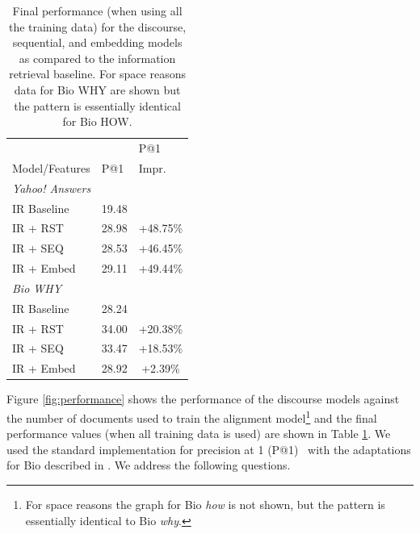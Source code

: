 \begin{table}[t!]
\begin{center}
\begin{footnotesize}
\begin{tabular}{llc}
\multicolumn{1}{l}{ } & \multicolumn{1}{l}{ } & \multicolumn{1}{l}{P@1} \\
\multicolumn{1}{l}{ Model/Features } & \multicolumn{1}{l}{P@1} & \multicolumn{1}{l}{Impr.} \\
\cline{2-3}

\hline
\multicolumn{3}{l}{\textit{Yahoo! Answers}} \\ %
\hline
IR Baseline 	& 19.48 	&	  				\\
IR + RST  		& 28.98		& +48.75\% 			\\
IR + SEQ  		& 28.53		& +46.45\% 			\\
IR + Embed  		& 29.11		& +49.44\% 			\\
\hline
\multicolumn{3}{l}{\textit{Bio WHY}} \\ %
\hline
IR Baseline 	& 28.24 	&	  				\\
IR + RST  		& 34.00		& +20.38\% 			\\
IR + SEQ  		& 33.47		& +18.53\% 			\\
IR + Embed  		& 28.92		& +2.39\% 			\\
\end{tabular}
\end{footnotesize}
\caption{{\small Final performance (when using all the training data) for the discourse, sequential, and embedding models as compared to the information retrieval baseline. For space reasons data for Bio WHY are shown but the pattern is essentially identical for Bio HOW.}}
\label{tab:overall}
\end{center}
\end{table}

Figure \ref{fig:performance} shows the performance of the discourse models against the number of documents used to train the alignment model\footnote{For space reasons the graph for Bio \emph{how} is not shown, but the pattern is essentially identical to Bio \emph{why}.} and the final performance values (when all training data is used) are shown in Table \ref{tab:overall}.   We used the standard implementation for precision at 1 (P@1)~\citep{manning08} with the adaptations for Bio described in \citet{jansen14}. We address the following questions.

